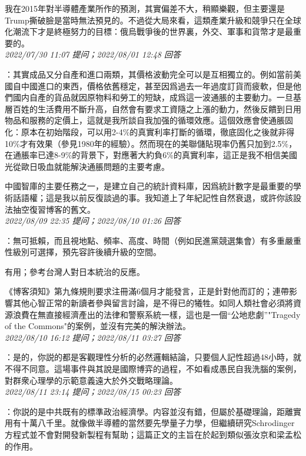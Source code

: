 \documentclass[twocolumn]{ctexart}
\begin{document}
我在2015年對半導體產業所作的預測，其實偏差不大，稍顯樂觀，但主要還是Trump撕破臉是當時無法預見的。不過從大局來看，這類產業升級和競爭只在全球化潮流下才是終極努力的目標：俄烏戰爭後的世界裏，外交、軍事和貨幣才是最重要的。
\\

\textit{\hfill\noindent\small 2022/07/30 11:07 提问；2022/08/01 12:48 回答}

：其實成品又分自產和進口兩類，其價格波動完全可以是互相獨立的。例如當前美國自中國進口的東西，價格依舊穩定，甚至因爲過去一年過度訂貨而疲軟，但是他們國内自產的貨品就因原物料和勞工的短缺，成爲這一波通脹的主要動力。一旦基層百姓的生活費用不斷升高，自然會有要求工資隨之上漲的動力，然後反饋到日用物品和服務的定價上，這就是我所談自我加强的循環效應。這個效應會使通脹固化：原本在初始階段，可以用2-4\%的真實利率打斷的循環，徹底固化之後就非得10\%才有效果（參見1980年的經驗）。然而現在的美聯儲貼現率仍舊只加到2.5\%，在通脹率已達8-9\%的背景下，對應著大約負6\%的真實利率，這正是我不相信美國光從歐日吸血就能解決通脹問題的主要考慮。

中國智庫的主要任務之一，是建立自己的統計資料庫，因爲統計數字是最重要的學術話語權；這是我以前反復談過的事。我知道上了年紀記性自然衰退，或許你該設法抽空復習博客的舊文。
\\

\textit{\hfill\noindent\small 2022/08/09 22:35 提问；2022/08/10 01:26 回答}

：無可抵賴，而且視地點、頻率、高度、時間（例如民進黨競選集會）有多重嚴重性級別可選擇，預先容許後續升級的空間。

有用；參考台灣人對日本統治的反應。

《博客須知》第九條規則要求注冊滿6個月才能發言，正是針對他而訂的；連帶影響其他心智正常的新讀者參與留言討論，是不得已的犧牲。如同人類社會必須將資源浪費在無直接經濟產出的法律和警察系統一樣，這也是一個“公地悲劇”"Tragedy of the Commons"的案例，並沒有完美的解決辦法。
\\

\textit{\hfill\noindent\small 2022/08/10 16:12 提问；2022/08/11 03:27 回答}

：是的，你説的都是客觀理性分析的必然邏輯結論，只要個人記性超過48小時，就不得不同意。這場事件與其說是國際博弈的過程，不如看成愚民自我洗腦的案例，對群衆心理學的示範意義遠大於外交戰略理論。
\\

\textit{\hfill\noindent\small 2022/08/11 23:14 提问；2022/08/15 00:23 回答}

：你説的是中共既有的標準政治經濟學。内容並沒有錯，但屬於基礎理論，距離實用有十萬八千里。就像做半導體的當然要先學量子力學，但繼續研究Schrodinger方程式並不會對開發新製程有幫助；這篇正文的主旨在於起到類似張汝京和梁孟松的作用。
\\
\end{document}
